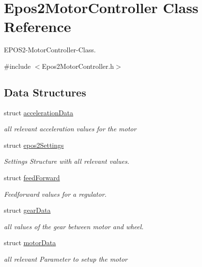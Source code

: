 \hypertarget{classEpos2MotorController}{\section{Epos2\-Motor\-Controller Class Reference}
\label{classEpos2MotorController}
}


E\-P\-O\-S2-\/\-Motor\-Controller-\/\-Class.  




{\ttfamily \#include $<$Epos2\-Motor\-Controller.\-h$>$}

\subsection*{Data Structures}
\begin{DoxyCompactItemize}
\item 
struct \hyperlink{structEpos2MotorController_1_1accelerationData}{acceleration\-Data}
\begin{DoxyCompactList}\small\item\em all relevant acceleration values for the motor \end{DoxyCompactList}\item 
struct \hyperlink{structEpos2MotorController_1_1epos2Settings}{epos2\-Settings}
\begin{DoxyCompactList}\small\item\em Settings Structure with all relevant values. \end{DoxyCompactList}\item 
struct \hyperlink{structEpos2MotorController_1_1feedForward}{feed\-Forward}
\begin{DoxyCompactList}\small\item\em Feedforward values for a regulator. \end{DoxyCompactList}\item 
struct \hyperlink{structEpos2MotorController_1_1gearData}{gear\-Data}
\begin{DoxyCompactList}\small\item\em all values of the gear between motor and wheel. \end{DoxyCompactList}\item 
struct \hyperlink{structEpos2MotorController_1_1motorData}{motor\-Data}
\begin{DoxyCompactList}\small\item\em all relevant Parameter to setup the motor \end{DoxyCompactList}\item 

\end{DoxyCompactItemize}
